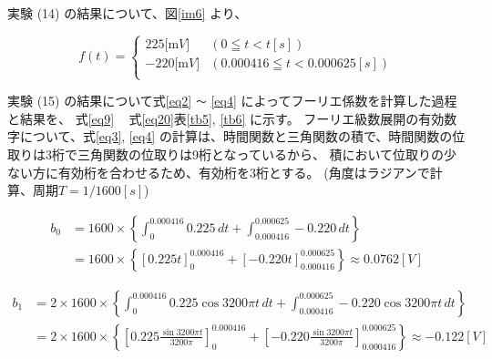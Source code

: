 実験 (14) の結果について、図\ref{im6} より、
\begin{screen}
  \begin{equation}
    f(t) = \left\{
      \begin{array}{ll}
        225 \si{[\milli V]} & (0 \leqq t < t \si{[s]})\\
        -220 \si{[\milli V]} & (0.000416 \leqq t < 0.000625 \si{[s]})\\
      \end{array}
      \right.
      \label{eq7}
    \end{equation}
\end{screen}

実験 (15) の結果について式\ref{eq2} \verb|～| \ref{eq4} によってフーリエ係数を計算した過程と結果を、
式\ref{eq9} ~ 式\ref{eq20}表\ref{tb5}, \ref{tb6} に示す。
フーリエ級数展開の有効数字について、式\ref{eq3}, \ref{eq4} の計算は、時間関数と三角関数の積で、時間関数の位取りは3桁で三角関数の位取りは9桁となっているから、
積において位取りの少ない方に有効桁を合わせるため、有効桁を3桁とする。
(角度はラジアンで計算、周期$T = 1/1600 \si{[s]} $)

\begin{screen}
\begin{equation}
  \begin{aligned}
    b_0 &= 1600\times\left\{ \int_{0}^{0.000416}0.225 \,dt+ \int_{0.000416}^{0.000625}-0.220 \,dt \right\}\\
    &= 1600\times\left\{ \left[0.225t\right]^{0.000416}_0+ \left[-0.220t\right]^{0.000625}_{0.000416} \right\} \approx 0.0762 \si{[V]} \label{eq8} 
  \end{aligned}
\end{equation}
\end{screen}

\begin{screen}
  \begin{equation}
    \begin{aligned}
      b_1 &= 2\times1600\times\left\{ \int_{0}^{0.000416}0.225\cos 3200\pi t \,dt+ \int_{0.000416}^{0.000625}-0.220\cos 3200\pi t \,dt \right\}\\
      &= 2\times1600\times\left\{ \left[0.225\frac{\sin3200\pi t}{3200\pi}\right]^{0.000416}_0+ \left[-0.220\frac{\sin 3200\pi t}{3200\pi}\right]^{0.000625}_{0.000416} \right\} \approx -0.122 \si{[V]} \label{eq9}
    \end{aligned}
  \end{equation}
\end{screen}


